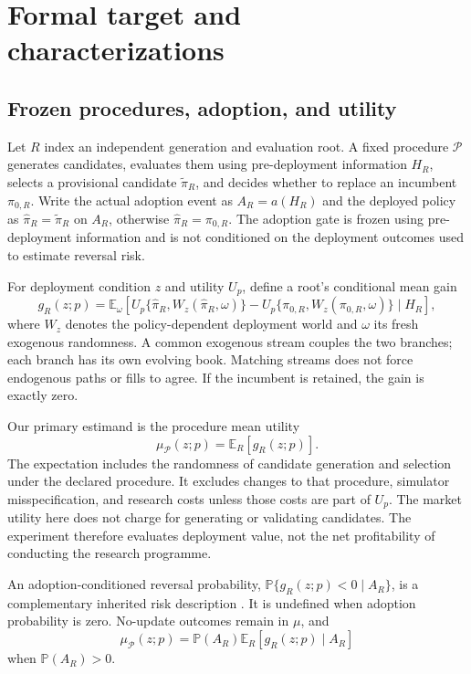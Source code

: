 \documentclass[10pt,letterpaper]{article}
\newcommand{\E}{\mathbb{E}}
\newcommand{\Prob}{\mathbb{P}}
\begin{document}
\section{Formal target and characterizations}
\subsection{Frozen procedures, adoption, and utility}
Let $R$ index an independent generation and evaluation root. A fixed procedure $\mathcal P$ generates candidates, evaluates them using pre-deployment information $H_R$, selects a provisional candidate $\widetilde\pi_R$, and decides whether to replace an incumbent $\pi_{0,R}$. Write the actual adoption event as $A_R=a(H_R)$ and the deployed policy as $\widehat\pi_R=\widetilde\pi_R$ on $A_R$, otherwise $\widehat\pi_R=\pi_{0,R}$. The adoption gate is frozen using pre-deployment information and is not conditioned on the deployment outcomes used to estimate reversal risk.

For deployment condition $z$ and utility $U_p$, define a root's conditional mean gain
\begin{equation}
g_R(z;p)=\E_\omega\left[U_p\{\widehat\pi_R,W_z(\widehat\pi_R,\omega)\}
-U_p\{\pi_{0,R},W_z(\pi_{0,R},\omega)\}\mid H_R\right],
\label{eq:root-gain}
\end{equation}
where $W_z$ denotes the policy-dependent deployment world and $\omega$ its fresh exogenous randomness. A common exogenous stream couples the two branches; each branch has its own evolving book. Matching streams does not force endogenous paths or fills to agree. If the incumbent is retained, the gain is exactly zero.

Our primary estimand is the procedure mean utility
\begin{equation}
\mu_{\mathcal P}(z;p)=\E_R[g_R(z;p)].\label{eq:procedure}
\end{equation}
The expectation includes the randomness of candidate generation and selection under the declared procedure. It excludes changes to that procedure, simulator misspecification, and research costs unless those costs are part of $U_p$. The market utility here does not charge for generating or validating candidates. The experiment therefore evaluates deployment value, not the net profitability of conducting the research programme.

An adoption-conditioned reversal probability, $\Prob\{g_R(z;p)<0\mid A_R\}$, is a complementary inherited risk description \citep{pivot}. It is undefined when adoption probability is zero. No-update outcomes remain in $\mu$, and
\begin{equation}
\mu_{\mathcal P}(z;p)=\Prob(A_R)\E_R[g_R(z;p)\mid A_R]
\label{eq:adoption-identity}
\end{equation}
when $\Prob(A_R)>0$.
\end{document}

